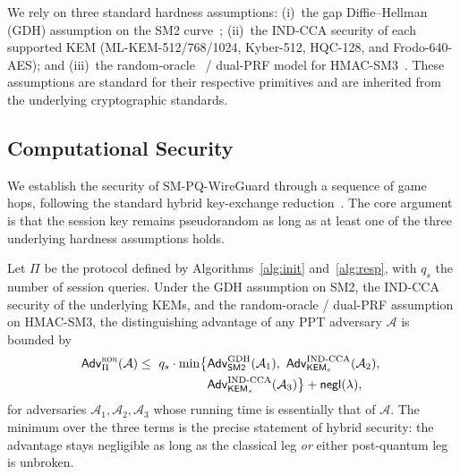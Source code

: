 \documentclass{SCIS2026}
\newcommand{\negl}{\mathsf{negl}}
\newcommand{\Adv}{\mathsf{Adv}}
\newcommand{\KEMs}{\textsf{KEM}_s}
\newcommand{\KEMe}{\textsf{KEM}_e}
\begin{document}
We rely on three standard hardness assumptions: (i)~the gap
Diffie--Hellman (GDH) assumption on the SM2
curve~\cite{17,18}; (ii)~the IND-CCA security of each
supported KEM (ML-KEM-512/768/1024, Kyber-512, HQC-128, and
Frodo-640-AES); and (iii)~the random-oracle~\cite{33} / dual-PRF model for
HMAC-SM3~\cite{34}.  These assumptions are standard for
their respective primitives and are inherited from the underlying
cryptographic standards.

\subsection{Computational Security}
\label{sec:formal}

We establish the security of SM-PQ-WireGuard through a sequence of
game hops, following the standard hybrid key-exchange
reduction~\cite{32}.  The core argument is that the
session key remains pseudorandom as long as at least one of the three
underlying hardness assumptions holds.

\begin{theorem}\label{thm:hybrid}
Let $\Pi$ be the protocol defined by Algorithms~\ref{alg:init}
and~\ref{alg:resp}, with $q_s$ the number of session queries.  Under
the GDH assumption on SM2, the IND-CCA security of the underlying
KEMs, and the random-oracle / dual-PRF assumption on HMAC-SM3, the
distinguishing advantage of any PPT adversary $\mathcal A$ is bounded by
\begin{align*}
\Adv^{\textsc{ror}}_{\Pi}(\mathcal A) \leq\
  q_s\cdot \min\bigl\{
  &\Adv^{\mathrm{GDH}}_{\textsf{SM2}}(\mathcal A_1),\
   \Adv^{\mathrm{IND\text{-}CCA}}_{\KEMe}(\mathcal A_2),\ \\
  &\Adv^{\mathrm{IND\text{-}CCA}}_{\KEMs}(\mathcal A_3)
  \bigr\}
   + \negl(\lambda),
\end{align*}
for adversaries $\mathcal A_1, \mathcal A_2, \mathcal A_3$ whose
running time is essentially that of $\mathcal A$.  The minimum over the
three terms is the precise statement of hybrid security: the advantage
stays negligible as long as the classical leg \emph{or} either
post-quantum leg is unbroken.
\end{theorem}
\end{document}
